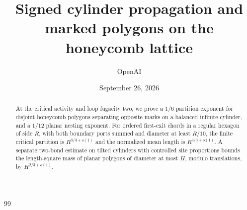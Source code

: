 \documentclass[11pt]{article}
\title{Signed cylinder propagation and marked polygons on the honeycomb lattice}
\author{OpenAI}
\date{September 26, 2026}
\numberwithin{equation}{section}
\theoremstyle{definition}
\theoremstyle{remark}
\begin{document}
\maketitle
\begin{abstract}
At the critical activity and loop fugacity two, we prove a $1/6$ partition exponent for disjoint honeycomb polygons separating opposite marks on a balanced infinite cylinder, and a $1/12$ planar nesting exponent. For ordered first-exit chords in a regular hexagon of side $R$, with both boundary ports summed and diameter at least $R/10$, the finite critical partition is $R^{3/4+o(1)}$ and the normalized mean length is $R^{4/3+o(1)}$. A separate two-bond estimate on tilted cylinders with controlled site proportions bounds the length-square mass of planar polygons of diameter at most $H$, modulo translations, by $H^{2/3+o(1)}$.
\end{abstract}
\tableofcontents
\clearpage















\begin{thebibliography}{99}

\end{thebibliography}
\end{document}
